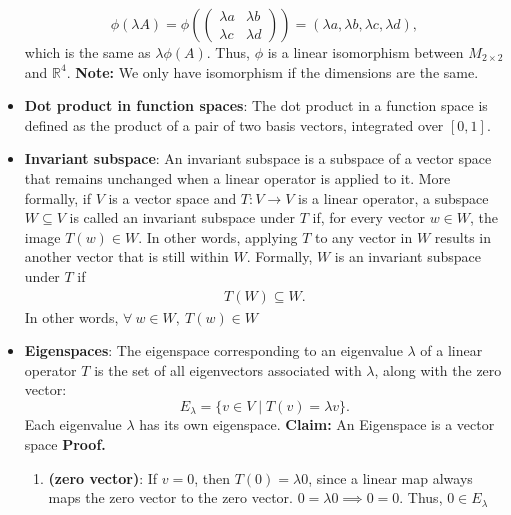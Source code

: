 \documentclass{report}
\begin{document}
\begin{itemize}
\begin{itemize}
            \end{itemize}
            \[
                \phi(\lambda A) = \phi\left(\begin{pmatrix} \lambda a & \lambda b \\ \lambda c & \lambda d \end{pmatrix}\right) = (\lambda a, \lambda b, \lambda c, \lambda d),
            \]
            \bigbreak \noindent 
            which is the same as $\lambda \phi(A)$.
            \bigbreak \noindent 
            Thus, $\phi$ is a linear isomorphism between $M_{2 \times 2}$ and $\mathbb{R}^4$.
            \bigbreak \noindent 
            \textbf{Note:} We only have isomorphism if the dimensions are the same.
        \item \textbf{Dot product in function spaces}: The dot product in a function space is defined as the product of a pair of two basis vectors, integrated over $[0,1]$.
        \item \textbf{Invariant subspace}:
            An invariant subspace is a subspace of a vector space that remains unchanged when a linear operator is applied to it. More formally, if \( V \) is a vector space and \( T: V \to V \) is a linear operator, a subspace \( W \subseteq V \) is called an invariant subspace under \( T \) if, for every vector \( w \in W \), the image \( T(w) \in W \). In other words, applying \( T \) to any vector in \( W \) results in another vector that is still within \( W \).
            \bigbreak \noindent 
            Formally, $W$ is an invariant subspace under $T$ if
            \begin{align*}
                T(W) \subseteq W
            .\end{align*}
            In other words, $\forall \ w \in W, \ T(w) \in W $
        \item \textbf{Eigenspaces}:
            The eigenspace corresponding to an eigenvalue \( \lambda \) of a linear operator \( T \) is the set of all eigenvectors associated with \( \lambda \), along with the zero vector:
            \[
                E_{\lambda} = \{ v \in V \mid T(v) = \lambda v \}.
            \]
            Each eigenvalue \( \lambda \) has its own eigenspace.
            \bigbreak \noindent 
            \textbf{Claim:} An Eigenspace is a vector space
            \bigbreak \noindent 
            \textbf{Proof.}
            \begin{enumerate}
                \item \textbf{(zero vector)}: If $v=0$, then $T(0) = \lambda 0$, since a linear map always maps the zero vector to the zero vector. $0 = \lambda 0 \implies 0 = 0$. Thus, $0 \in E_{\lambda}$

\end{enumerate}
\end{itemize}
\end{document}
